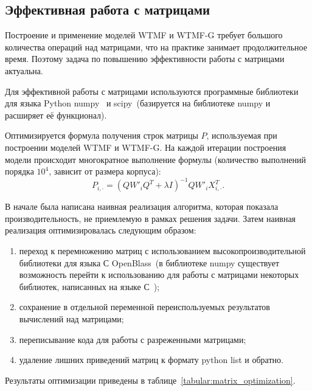 
\subsection{Эффективная работа с матрицами}
    Построение и применение моделей WTMF и WTMF-G требует большого количества операций над матрицами, что на практике занимает продолжительное время.
    Поэтому задача по повышению эффективности работы с матрицами актуальна.

    Для эффективной работы с матрицами используются программные библиотеки для языка Python numpy~\cite{numpy} и
    scipy~(базируется на библиотеке numpy и расширяет её функционал).

    Оптимизируется формула получения строк матрицы $P$, используемая при построении моделей WTMF и WTMF-G.
    На каждой итерации построения модели происходит многократное выполнение формулы (количество выполнений порядка $10^4$, зависит от размера корпуса):
    $$P_{i, \cdot} = (Q W'_i Q^T + \lambda I)^{-1} Q W'_i X_{i,\cdot}^T.$$

    В начале была написана наивная реализация алгоритма, которая показала производительность, не приемлемую в рамках решения задачи.
    Затем наивная реализация оптимизировалась следующим образом:
    \begin{enumerate}
        \item переход к перемножению матриц с использованием высокопроизводительной библиотеки для языка С OpenBlass~(в библиотеке numpy существует возможность перейти к использованию для работы с матрицами некоторых библиотек, написанных на языке С~\cite{openblass});
        \item сохранение в отдельной переменной переиспользуемых результатов вычислений над матрицами;
        \item переписывание кода для работы с разреженными матрицами;
        \item удаление лишних приведений матриц к формату python list и обратно.
    \end{enumerate}
    Результаты оптимизации приведены в таблице~\ref{tabular:matrix_optimization}.

